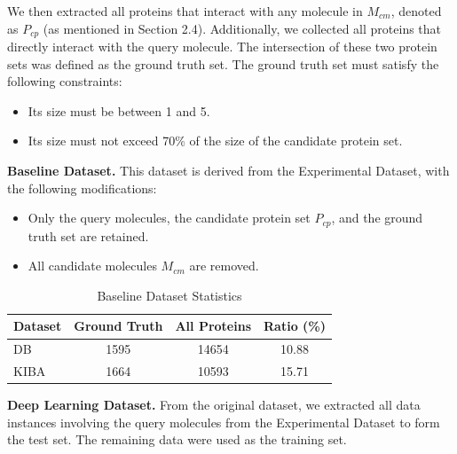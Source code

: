 \documentclass[letterpaper,twocolumn,10pt]{llncs}
\begin{document}
We then extracted all proteins that interact with any molecule in $M_{cm}$, denoted as $P_{cp}$ (as mentioned in Section 2.4). Additionally, we collected all proteins that directly interact with the query molecule. The intersection of these two protein sets was defined as the ground truth set.
The ground truth set must satisfy the following constraints:

\begin{itemize}
\item Its size must be between 1 and 5.
\item Its size must not exceed 70\% of the size of the candidate protein set.
\end{itemize}

\textbf{Baseline Dataset.} This dataset is derived from the Experimental Dataset, with the following modifications:

\begin{itemize}
\item Only the query molecules, the candidate protein set $P_{cp}$, and the ground truth set are retained.
\item All candidate molecules $M_{cm}$ are removed.
\end{itemize}

\begin{table}[!htbp]
\centering
\caption{Baseline Dataset Statistics}
\label{tab:baseline_stats}
\scriptsize  %
\setlength{\tabcolsep}{20pt}  %
\begin{tabular}{l S[table-format=4.0] S[table-format=5.0] S[table-format=2.2]}
\toprule
{Dataset} & {Ground Truth} & {All Proteins} & {Ratio (\%)} \\
\midrule
DB       & 1595  & 14654 & 10.88 \\
KIBA     & 1664  & 10593 & 15.71 \\
\bottomrule
\end{tabular}
\end{table}

\textbf{Deep Learning Dataset.} From the original dataset, we extracted all data instances involving the query molecules from the Experimental Dataset to form the test set. The remaining data were used as the training set. 

\begin{table}[!htbp]
\centering
\caption{Deep Learning Dataset Statistics}
\label{tab:dl_dataset}
\end{table}
\end{document}
